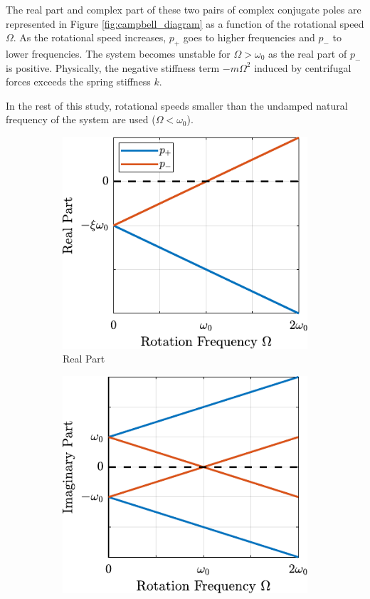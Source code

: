 \documentclass{ISMA_USD2020}
\begin{document}
The real part and complex part of these two pairs of complex conjugate poles are represented in Figure \ref{fig:campbell_diagram} as a function of the rotational speed \(\Omega\).
As the rotational speed increases, \(p_{+}\) goes to higher frequencies and \(p_{-}\) to lower frequencies.
The system becomes unstable for \(\Omega > \omega_0\) as the real part of \(p_{-}\) is positive.
Physically, the negative stiffness term \(-m\Omega^2\) induced by centrifugal forces exceeds the spring stiffness \(k\).

In the rest of this study, rotational speeds smaller than the undamped natural frequency of the system are used (\(\Omega < \omega_0\)).

\begin{figure}[htbp]
\begin{subfigure}[c]{0.4\linewidth}
\includegraphics[width=\linewidth]{figs/campbell_diagram_real.pdf}
\caption{\label{fig:campbell_diagram_real} Real Part}
\end{subfigure}
\begin{subfigure}[c]{0.4\linewidth}
\includegraphics[width=\linewidth]{figs/campbell_diagram_imag.pdf}

\end{subfigure}
\end{figure}
\end{document}
